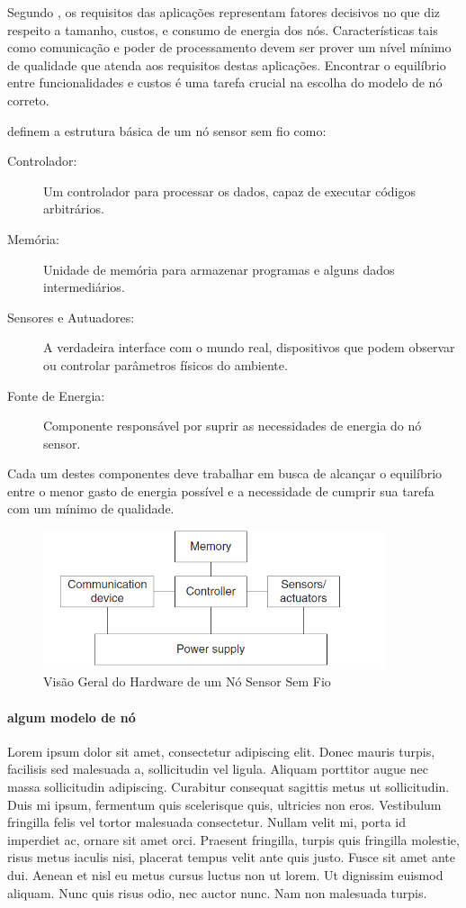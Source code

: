 Segundo \cite{Holger2005}, os requisitos das aplicações representam fatores decisivos no que diz respeito a tamanho, custos, e consumo de energia dos nós. Características tais como comunicação e poder de processamento devem ser prover um nível mínimo de qualidade que atenda aos requisitos destas aplicações. Encontrar o equilíbrio entre funcionalidades e custos é uma tarefa crucial na escolha do modelo de nó correto.

\cite{Holger2005} definem a estrutura básica de um nó sensor sem fio como:
\begin{description}
\item[Controlador:] Um controlador para processar os dados, capaz de executar códigos arbitrários.
\item[Memória:] Unidade de memória para armazenar programas e alguns dados intermediários.
\item[Sensores e Autuadores:] A verdadeira interface com o mundo real, dispositivos que podem observar ou controlar parâmetros físicos do ambiente.
\item[Fonte de Energia:] Componente responsável por suprir as necessidades de energia do nó sensor.
\end{description}

Cada um destes componentes deve trabalhar em busca de alcançar o equilíbrio entre o menor gasto de energia possível e a necessidade de cumprir sua tarefa com um mínimo de qualidade.

\begin{figure}
\centering
\includegraphics[width=10cm]{pictures/overview_node.png}
\caption{Visão Geral do Hardware de um Nó Sensor Sem Fio}
 \label{fig:overview}
\end{figure}

\paragraph{algum modelo de nó}

Lorem ipsum dolor sit amet, consectetur adipiscing elit. Donec mauris turpis, facilisis sed malesuada a, sollicitudin vel ligula. Aliquam porttitor augue nec massa sollicitudin adipiscing. Curabitur consequat sagittis metus ut sollicitudin. Duis mi ipsum, fermentum quis scelerisque quis, ultricies non eros. Vestibulum fringilla felis vel tortor malesuada consectetur. Nullam velit mi, porta id imperdiet ac, ornare sit amet orci. Praesent fringilla, turpis quis fringilla molestie, risus metus iaculis nisi, placerat tempus velit ante quis justo. Fusce sit amet ante dui. Aenean et nisl eu metus cursus luctus non ut lorem. Ut dignissim euismod aliquam. Nunc quis risus odio, nec auctor nunc. Nam non malesuada turpis.

